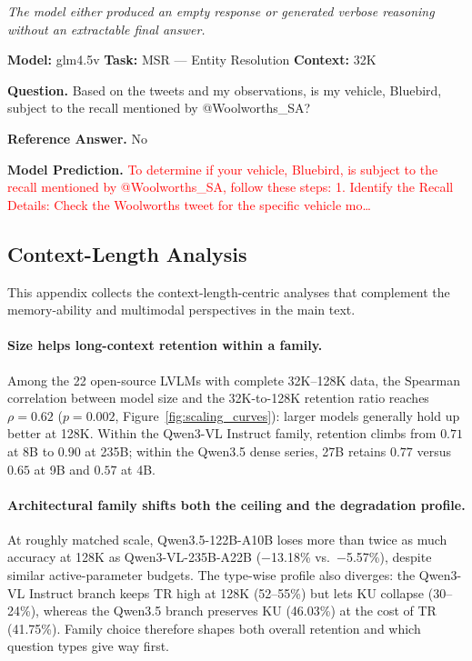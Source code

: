 \documentclass{article}
\begin{document}
\begin{tcolorbox}[
  title={Case Study: Non-Answer Pathology},
  enhanced, sharp corners,
  colback=gray!3, colframe=black!40,
  boxrule=0.4pt, fonttitle=\bfseries,
  left=4pt, right=4pt, top=3pt, bottom=3pt
]
\footnotesize

\textit{The model either produced an empty response or generated verbose reasoning without an extractable final answer.}
\vspace{0.4em}

\textbf{Model:} glm4.5v \hfill \textbf{Task:} MSR --- Entity Resolution \hfill \textbf{Context:} 32K
\vspace{0.3em}

\textbf{Question.} Based on the tweets and my observations, is my vehicle, Bluebird, subject to the recall mentioned by @Woolworths\_SA?
\vspace{0.3em}

\textbf{Reference Answer.} No

\textbf{Model Prediction.} \textcolor{red}{To determine if your vehicle, Bluebird, is subject to the recall mentioned by @Woolworths\_SA, follow these steps: 1. Identify the Recall Details: Check the Woolworths tweet for the specific vehicle mo\ldots}

\end{tcolorbox}


\subsection{Context-Length Analysis}
\label{app:extended_analysis}

This appendix collects the context-length-centric analyses that complement the memory-ability and multimodal perspectives in the main text.

\paragraph{Size helps long-context retention within a family.}
Among the 22 open-source LVLMs with complete 32K--128K data, the Spearman correlation between model size and the 32K-to-128K retention ratio reaches $\rho = 0.62$ ($p = 0.002$, Figure~\ref{fig:scaling_curves}): larger models generally hold up better at 128K. Within the Qwen3-VL Instruct family, retention climbs from $0.71$ at 8B to $0.90$ at 235B; within the Qwen3.5 dense series, 27B retains $0.77$ versus $0.65$ at 9B and $0.57$ at 4B.

\paragraph{Architectural family shifts both the ceiling and the degradation profile.}
At roughly matched scale, Qwen3.5-122B-A10B loses more than twice as much accuracy at 128K as Qwen3-VL-235B-A22B ($-$13.18\% vs.\ $-$5.57\%), despite similar active-parameter budgets. The type-wise profile also diverges: the Qwen3-VL Instruct branch keeps TR high at 128K (52--55\%) but lets KU collapse (30--24\%), whereas the Qwen3.5 branch preserves KU (46.03\%) at the cost of TR (41.75\%). Family choice therefore shapes both overall retention and which question types give way first.
\end{document}
